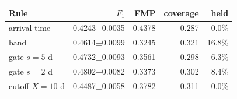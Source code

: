 \begin{tabular}{lrrrr}
\toprule
Rule & $F_1$ & FMP & coverage & held \\
\midrule
arrival-time & 0.4243$\pm$0.0035 & 0.4378 & 0.287 & 0.0\% \\
band & 0.4614$\pm$0.0099 & 0.3245 & 0.321 & 16.8\% \\
gate $s=5$ d & 0.4732$\pm$0.0093 & 0.3561 & 0.298 & 6.3\% \\
gate $s=2$ d & 0.4802$\pm$0.0082 & 0.3373 & 0.302 & 8.4\% \\
cutoff $X=10$ d & 0.4487$\pm$0.0058 & 0.3782 & 0.311 & 0.0\% \\
\bottomrule
\end{tabular}